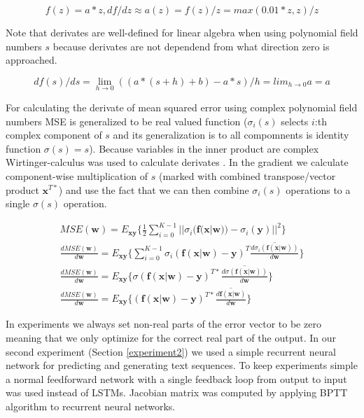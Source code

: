\documentclass[preprint,12pt]{elsarticle}
\begin{document}
\begin{equation}
  f(z) = a*z,df/dz \approx a(z) = f(z)/z = max(0.01*z,z)/z
\end{equation}

Note that derivates are well-defined for linear algebra when using polynomial field numbers $s$ because derivates are not dependend from what direction zero is approached.

\begin{equation}
  df(s)/ds = \lim_{h \to 0} ((a*(s+h) +b) - a*s)/h = lim_{h \to 0} a = a
\end{equation}


For calculating the derivate of mean squared error using complex polynomial field numbers MSE is generalized to be real valued function ($\sigma_i(s)$ selects $i$:th complex component of $s$ and its generalization is to all compomnents is identity function $\sigma(s) = s$). Because variables in the inner product are complex Wirtinger-calculus was used to calculate derivates \cite{complexgradientarticle}. In the gradient we calculate component-wise multiplication of $s$ (marked with combined transpose/vector product $\mathbf{x}^{T*}$) and use the fact that we can then combine $\sigma_i(s)$ operations to a single $\sigma(s)$ operation.

\begin{equation}
  \begin{gathered}
    MSE(\mathbf{w}) = E_{\mathbf{x}\mathbf{y}}\{\frac{1}{2} \sum_{i=0}^{K-1} ||\sigma_i(\mathbf{f}(\mathbf{x}|\mathbf{w}))-\sigma_i(\mathbf{y})||^2\} \\
    \frac{dMSE(\mathbf{w})}{d\mathbf{w}} = E_{\mathbf{x}\mathbf{y}}\{\sum_{i=0}^{K-1}\sigma_i(\mathbf{f}(\mathbf{x}|\mathbf{w})-\mathbf{y})^T\overline{\frac{d\sigma_i(\mathbf{f}(\mathbf{x}|\mathbf{w}))}{d\mathbf{w}}}\} \\
    \frac{dMSE(\mathbf{w})}{d\mathbf{w}} = E_{\mathbf{x}\mathbf{y}}\{\sigma(\mathbf{f}(\mathbf{x}|\mathbf{w})-\mathbf{y})^{T*}\overline{\frac{d\sigma(\mathbf{f}(\mathbf{x}|\mathbf{w}))}{d\mathbf{w}}}\} \\
    \frac{dMSE(\mathbf{w})}{d\mathbf{w}} = E_{\mathbf{x}\mathbf{y}}\{(\mathbf{f}(\mathbf{x}|\mathbf{w})-\mathbf{y})^{T*}\overline{\frac{d\mathbf{f}(\mathbf{x}|\mathbf{w})}{d\mathbf{w}}}\}
  \end{gathered}
\end{equation}

In experiments we always set non-real parts of the error vector to be zero meaning that we only optimize for the correct real part of the output. In our second experiment (Section \ref{experiment2}) we used a simple recurrent neural network for predicting and generating text sequences. To keep experiments simple a normal feedforward network with a single feedback loop from output to input was used instead of LSTMs. Jacobian matrix was computed by applying BPTT algorithm to recurrent neural networks.
\end{document}
